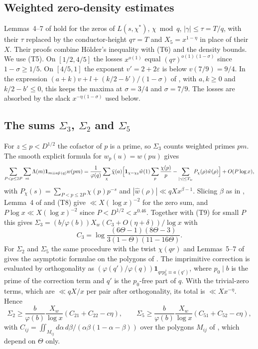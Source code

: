 \documentclass[11pt]{amsart}
\theoremstyle{definition}
\numberwithin{equation}{section}
\begin{document}
\subsection{Weighted zero-density estimates}
Lemmas~4--7 of \cite{HBI} hold for the zeros of $L(s,\chi^*)$, $\chi\bmod q$, $|\gamma|\le\tau=T/q$, with their $\tau$ replaced by the conductor-height $q\tau=T$ and $X_5=x^{1-\eta}$ in place of their $X$. Their proofs combine Hölder's inequality with (T6) and the density bounds. We use (T5). On $[1/2,4/5]$ the losses $x^{o(1)}$ equal $(q\tau)^{o(1)(1-\sigma)}$ since $1-\sigma\ge1/5$. On $[4/5,1]$ the exponent $v'=2+2\varepsilon$ is below $v(7/9)=9/4$. In the expression $(a+k)v+l+(k/2-b')/(1-\sigma)$ of \cite[p.~64]{HBI}, with $a,k\ge0$ and $k/2-b'\le0$, this keeps the maxima at $\sigma=3/4$ and $\sigma=7/9$. The losses are absorbed by the slack $x^{-\eta(1-\sigma)}$ used below.

\subsection{The sums $\Sigma_3$, $\Sigma_2$ and $\Sigma_5$}
For $z\le p<D^{1/2}$ the cofactor of $p$ is a prime, so $\Sigma_3$ counts weighted primes $pm$. The smooth explicit formula for $w_p(u)=w(pu)$ gives
\[
\sum_{P<p\le2P}\sum_m\Lambda(m)\mathbf 1_{m\equiv a\bar p\,(q)}w(pm)=\frac1{\varphi(q)}\sum_\chi\bar\chi(a)\Bigl[\mathbf 1_{\chi=\chi_0}\hat w(1)\sum_p\frac{\chi(p)}p-\sum_{|\gamma|\le T_w}P_\chi(\rho)\hat w(\rho)\Bigr]+O(P\log x),
\]
with $P_\chi(s)=\sum_{P<p\le2P}\chi(p)p^{-s}$ and $|\hat w(\rho)|\ll qXx^{\beta-1}$. Slicing $\beta$ as in \cite[p.~65]{HBI}, Lemma~4 of \cite{HBI} and (T8) give $\ll X(\log x)^{-2}$ for the zero sum, and $P\log x\ll X(\log x)^{-2}$ since $P<D^{1/2}<x^{0.46}$. Together with (T9) for small $P$ this gives $\Sigma_3=(b/\varphi(b))X_w(C_3+O(\eta+\delta))/\log x$ with
\[
C_3=\log\frac{(6\Theta-1)(8\Theta-3)}{3(1-\Theta)(11-16\Theta)}.
\]
For $\Sigma_2$ and $\Sigma_5$ the same procedure with the twist $\chi(qr)$ and Lemmas~5--7 of \cite{HBI} gives the asymptotic formulae on the polygons of \cite[pp.~66--68]{HBI}. The imprimitive correction is evaluated by orthogonality as $(\varphi(q')/\varphi(q))\mathbf 1_{qrp_0^j\equiv a\,(q')}$, where $p_0\mid b$ is the prime of the correction term and $q'$ is the $p_0$-free part of $q$. With the trivial-zero terms, which are $\ll qX/x$ per pair after orthogonality, its total is $\ll Xx^{-\eta}$. Hence
\[
\Sigma_2\ge\frac{b}{\varphi(b)}\frac{X_w}{\log x}(C_{21}+C_{22}-c\eta),\qquad\Sigma_5\ge\frac{b}{\varphi(b)}\frac{X_w}{\log x}(C_{51}+C_{52}-c\eta),
\]
with $C_{ij}=\iint_{M_{ij}}d\alpha\,d\beta/(\alpha\beta(1-\alpha-\beta))$ over the polygons $M_{ij}$ of \cite{HBI}, which depend on $\Theta$ only.
\end{document}
